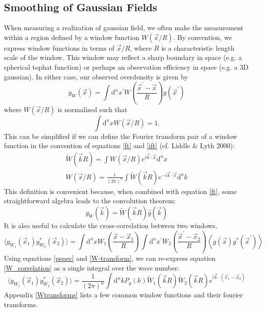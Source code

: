 \documentclass[12pt,preprint]{aastex}			%
\newcommand{\dd}{\mathrm{d}}
\begin{document}
\subsection{Smoothing of Gaussian Fields}
\label{smoothing}
When measuring a realization of gaussian field, we often make the measurement
within a region defined by a window function $W(\vec x/R)$.
By convention, we express window functions in terms of $\vec x/R$,
where $R$ is a characteristic length scale of the window.
This window may reflect a sharp boundary in space (e.g. a spherical tophat 
function) or perhaps an observation efficiency in space (e.g. a 3D gaussian).
In either case, our observed overdensity is given by
\begin{equation}
  g_W(\vec x) = \int \dd^n x^\prime 
  W\left(\frac{\vec{x}^\prime-\vec{x}}{R}\right) g(\vec{x}^\prime)
\end{equation}
where $W(\vec x/R)$ is normalized such that
\begin{equation}
  \label{W_normalization}
  \int \dd^nx W(\vec{x}/R) = 1.
\end{equation}
This can be simplified if we can define the Fourier transform pair 
of a window function in the convention
of equations \ref{ft} and \ref{ift} (cf. Liddle \& Lyth 2000):
\begin{eqnarray}
  \label{W-transform}
  \widetilde{W}(\vec{k}R) = \int W(\vec{x}/R) e^{i\vec{k}\cdot\vec{x}}\dd^nx 
  \nonumber\\
  W(\vec{x}/R) = \frac{1}{(2\pi)^n}\int 
  \widetilde{W}(\vec{k}R) e^{-i\vec{k}\cdot\vec{x}}\dd^nk 
\end{eqnarray}
This definition is convenient because, when combined with equation \ref{ft},
some straightforward algebra leads to the convolution theorem:
\begin{equation}
  \hat g_W(\vec k) = \widetilde W(\vec k R)\hat g(\vec k)
\end{equation}
It is also useful to calculate the cross-correlation between two windows,
\begin{equation}
  \label{W_correlation}
  \langle g_{W_1}(\vec x_1)g^*_{W_2}(\vec x_2)\rangle = 
  \int \dd^n x 
  W_1\left(\frac{\vec{x}-\vec{x}_1}{R}\right) 
  \int \dd^n x^\prime 
  W_2\left(\frac{\vec{x}^\prime-\vec{x}_2}{R}\right) 
  \left\langle g(\vec{x})g^*(\vec{x}^\prime)  \right\rangle
\end{equation}
Using equations \ref{pspec} and \ref{W-transform}, we can re-express
equation \ref{W_correlation} as a single integral over the
wave number:
\begin{equation}
  \label{W_cov_simp}
  \langle g_{W_1}(\vec x_1)g^*_{W_2}(\vec x_2)\rangle = 
  \frac{1}{(2\pi)^n} \int \dd^nk
  P_g(k)\widetilde{W}_1(\vec{k}R)\widetilde{W}_2(\vec{k}R)
  e^{i\vec k\cdot(\vec x_1-\vec x_2)}
\end{equation}
Appendix \ref{Wtransforms} lists a few common window functions and
their fourier transforms.
\end{document}
